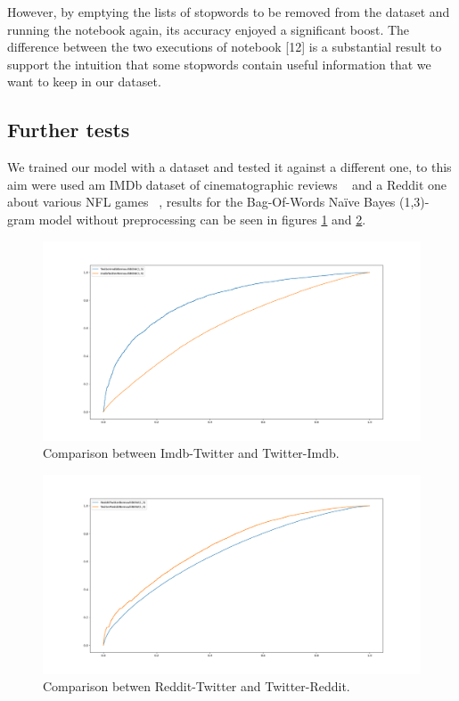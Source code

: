 However,  by emptying the lists of stopwords to be removed from the dataset and running the notebook again,  its accuracy enjoyed a significant boost.  The difference between the two executions of notebook [12] is a substantial result to support the intuition that some stopwords contain useful information that we want to keep in our dataset. 

\subsection*{Further tests}
We trained our model with a dataset and tested it against a different one, to this aim were used am IMDb dataset of cinematographic reviews ~\cite{data:imdb} and a Reddit one about various NFL games ~\cite{data:reddit}, results for the Bag-Of-Words Na\"ive Bayes (1,3)-gram model without preprocessing can be seen in figures \ref{fig:TwitterImdb} and \ref{fig:TwitterReddit}.

\begin{figure}[h!t]
    \centering
    \includegraphics[scale=0.25]{../experiments/plots/ImdbTwitter}
    \caption{Comparison between Imdb-Twitter and Twitter-Imdb.}
    \label{fig:TwitterImdb}        
\end{figure}

\begin{figure}[h!t]
    \centering
    \includegraphics[scale=0.25]{../experiments/plots/RedditTwitter}
    \caption{Comparison betwen Reddit-Twitter and Twitter-Reddit.}
    \label{fig:TwitterReddit}
\end{figure}

